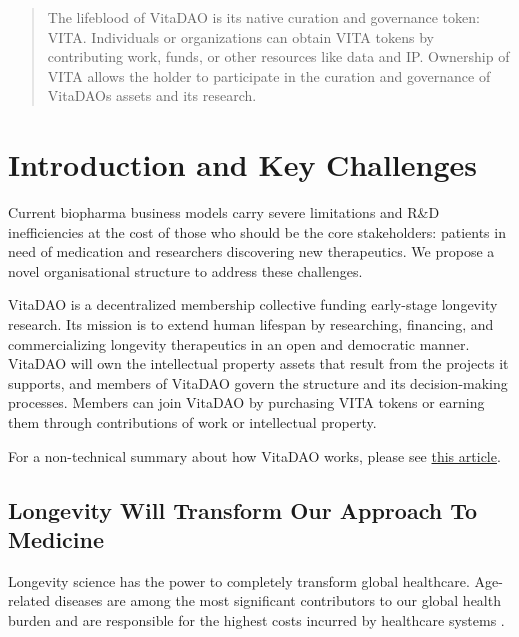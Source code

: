 \documentclass[10pt,letterpaper]{article}
\begin{document}
\begin{abstract}
The lifeblood of VitaDAO is its native curation and governance token: VITA. Individuals or organizations can obtain VITA tokens by contributing work, funds, or other resources like data and IP. Ownership of VITA allows the holder to participate in the curation and governance of VitaDAOs assets and its research.

\end{abstract}

\newpage
\renewcommand{\contentsname}{\centering Table of Contents}

\tableofcontents

\newpage

\section{Introduction and Key Challenges}
Current biopharma business models carry severe limitations and R\&D inefficiencies at the cost of those who should be the core stakeholders: patients in need of medication and researchers discovering new therapeutics. We propose a novel organisational structure to address these challenges.
 
VitaDAO is a decentralized membership collective funding early-stage longevity research. Its mission is to extend human lifespan by researching, financing, and commercializing longevity therapeutics in an open and democratic manner. VitaDAO will own the intellectual property assets that result from the projects it supports, and members of VitaDAO govern the structure and its decision-making processes. Members can join VitaDAO by purchasing VITA tokens or earning them through contributions of work or intellectual property.

For a non-technical summary about how VitaDAO works, please see \href{https://vitadao.medium.com/how-vitadao-works-61bbf861fe96}{this article}.

\subsection{Longevity Will Transform Our Approach To Medicine}
Longevity science has the power to completely transform global healthcare. Age-related diseases are among the most significant contributors to our global health burden and are responsible for the highest costs incurred by healthcare systems \citep{WHO2011}. 
\end{document}
